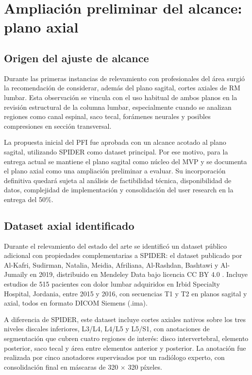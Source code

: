 \chapter{Ampliación preliminar del alcance: plano axial}
\label{anexo:modulo-axial-preliminar}

\section{Origen del ajuste de alcance}

Durante las primeras instancias de relevamiento con profesionales del área surgió la recomendación de considerar, además del plano sagital, cortes axiales de RM lumbar. Esta observación se vincula con el uso habitual de ambos planos en la revisión estructural de la columna lumbar, especialmente cuando se analizan regiones como canal espinal, saco tecal, forámenes neurales y posibles compresiones en sección transversal.

La propuesta inicial del PFI fue aprobada con un alcance acotado al plano sagital, utilizando SPIDER como dataset principal. Por ese motivo, para la entrega actual se mantiene el plano sagital como núcleo del MVP y se documenta el plano axial como una ampliación preliminar a evaluar. Su incorporación definitiva quedará sujeta al análisis de factibilidad técnica, disponibilidad de datos, complejidad de implementación y consolidación del user research en la entrega del 50\%.

\section{Dataset axial identificado}

Durante el relevamiento del estado del arte se identificó un dataset público adicional con propiedades complementarias a SPIDER: el dataset publicado por Al-Kafri, Sudirman, Natalia, Meidia, Afriliana, Al-Rashdan, Bashtawi y Al-Jumaily en 2019, distribuido en Mendeley Data bajo licencia CC BY 4.0 \parencite{alkafri_sudirman_boundary_2019}. Incluye estudios de 515 pacientes con dolor lumbar adquiridos en Irbid Specialty Hospital, Jordania, entre 2015 y 2016, con secuencias T1 y T2 en planos sagital y axial, todos en formato DICOM Siemens (.ima).

A diferencia de SPIDER, este dataset incluye cortes axiales nativos sobre los tres niveles discales inferiores, L3/L4, L4/L5 y L5/S1, con anotaciones de segmentación que cubren cuatro regiones de interés: disco intervertebral, elemento posterior, saco tecal y área entre elementos anterior y posterior. La anotación fue realizada por cinco anotadores supervisados por un radiólogo experto, con consolidación final en máscaras de 320 \(\times\) 320 píxeles.

